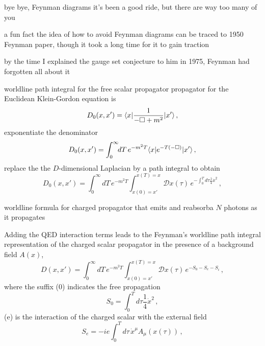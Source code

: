 \begin{frame}{bye bye, Feynman diagrams}
it's been a good ride, but there are way too many of you
\end{frame}

\begin{frame}{a fun fact}
the idea of how to avoid Feynman diagrams can be traced to 1950 Feynman
paper, though it took a long time for it to gain
traction

\bigskip

by the time I explained the gauge set conjecture to
him in 1975, Feynman had forgotten all about it
\end{frame}

\begin{frame}{worldline path integral for the free scalar propagator}
propagator for the Euclidean
Klein-Gordon equation is
\[ %
D_0(x,x')=\bra{x}\frac{1}{-\Box +m^2}\ket{x'}
\,,
\] %
exponentiate the
denominator
\[ %
D_0(x,x')=\int_0^\infty\!\!dT\,{e}^{-m^2T}\bra{x}e^{-T(-\Box)}\ket{x'}
\,,
\] %
replace the the $D$-dimensional Laplacian by a path integral
to obtain
\[ %
D_0(x,x')=\int_0^\infty\!\!dT\,e^{-m^2T}
\int_{x(0)=x'}^{x(T)=x}\!\!\!\!\mathcal{D}x(\tau)\,
    e^{-\int_0^T\!\!d\tau \frac{1}{4}\dot{x}^2}
\,,
\] %
\end{frame}

\begin{frame}{worldline formula for charged propagator}
that emits and reabsorba $N$ photons as it
propagates%

\medskip

Adding the QED
interaction terms leads to the Feynman's worldline path integral
representation of the charged scalar propagator
in the presence of a background field $A(x)$,
\[ %
D(x,x')=\int_0^\infty\!\!dT\,e^{-m^2T}
    \int_{x(0)=x'}^{x(T)=x}\!\!\mathcal{D}x(\tau)\,
            {e}^{-S_0-S_e-S_i}
\,,
\] %
where the suffix (0) indicates the free propagation
\[ %
S_0 = \int_0^T\!\!d\tau \frac{1}{4}\dot{x}^2
\,,
\] %
(e) is the interaction of the charged scalar with the external field
\[ %
S_e = -ie\int_0^T\!\!d\tau\,\dot{x}^\mu A_\mu(x(\tau))
\,,
\] %
\end{frame}

